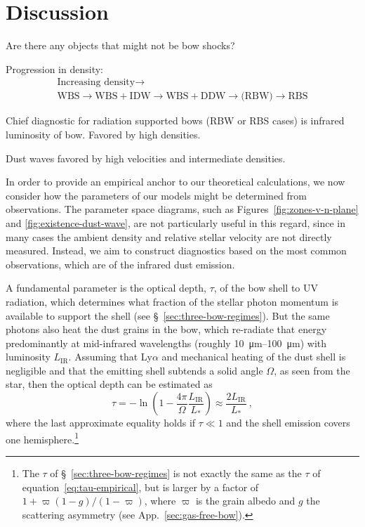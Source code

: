 \section{Discussion}
\label{sec:summary-discussion}

Are there any objects that might not be bow shocks?

Progression in density:
\begin{gather*}
  \text{Increasing density} \longrightarrow \\
  \text{WBS} \to \text{WBS} + \text{IDW} \to \text{WBS} + \text{DDW} \to \text{(RBW)} \to \text{RBS}
\end{gather*}

Chief diagnostic for radiation supported bows (RBW or RBS cases) is
infrared luminosity of bow.  Favored by high densities.

Dust waves favored by high velocities and intermediate densities.

\newcommand\IR{\ensuremath{_{\text{IR}}}}

In order to provide an empirical anchor to our theoretical
calculations, we now consider how the parameters of our models might
be determined from observations.  The parameter space diagrams, such
as Figures~\ref{fig:zones-v-n-plane} and
\ref{fig:existence-dust-wave}, are not particularly useful in this
regard, since in many cases the ambient density and relative stellar
velocity are not directly measured.  Instead, we aim to construct
diagnostics based on the most common observations, which are of the
infrared dust emission.

A fundamental parameter is the optical depth, \(\tau\), of the bow shell
to UV radiation, which determines what fraction of the stellar photon
momentum is available to support the shell (see
\S~\ref{sec:three-bow-regimes}).  But the same photons also heat the
dust grains in the bow, which re-radiate that energy predominantly at
mid-infrared wavelengths (roughly \SIrange{10}{100}{\um}) with
luminosity \(L\IR\).  Assuming that Ly\(\alpha\) and mechanical heating of
the dust shell is negligible and that the emitting shell subtends a
solid angle \(\Omega\), as seen from the star, then the optical depth can
be estimated as
\begin{equation}
  \label{eq:tau-empirical}
  \tau = -\ln \left( 1 - \frac{4\pi}{\Omega} \frac{L\IR}{L_*} \right)
  \approx \frac{2 L\IR}{L_*} \ ,
\end{equation}
where the last approximate equality holds if \(\tau \ll 1\) and the shell
emission covers one hemisphere.\footnote{%
  The \(\tau\) of \S~\ref{sec:three-bow-regimes} is not exactly the same
  as the \(\tau\) of equation~\eqref{eq:tau-empirical}, but is larger by
  a factor of \(1 + \varpi (1 - g)/(1 - \varpi)\), where \(\varpi\) is
  the grain albedo and \(g\) the scattering asymmetry (see
  App.~\ref{sec:gas-free-bow}).} %

